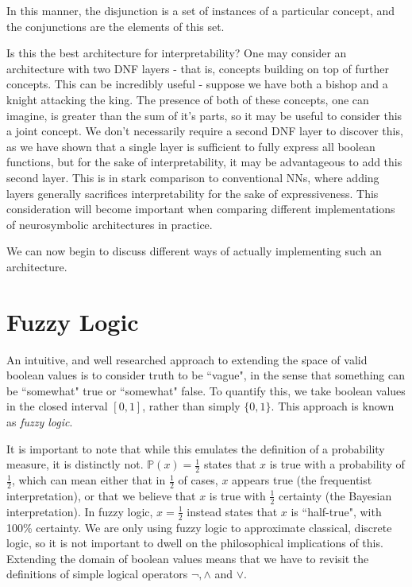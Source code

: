 \documentclass[conference]{report}
\begin{document}
In this manner, the disjunction is a set of instances of a particular concept, and the conjunctions are the elements of this set.

Is this the best architecture for interpretability? One may consider an architecture with two DNF layers - that is, concepts building on top of further concepts. This can be incredibly useful - suppose we have both a bishop and a knight attacking the king. The presence of both of these concepts, one can imagine, is greater than the sum of it's parts, so it may be useful to consider this a joint concept. We don't necessarily require a second DNF layer to discover this, as we have shown that a single layer is sufficient to fully express all boolean functions, but for the sake of interpretability, it may be advantageous to add this second layer. This is in stark comparison to conventional NNs, where adding layers generally sacrifices interpretability for the sake of expressiveness. This consideration will become important when comparing different implementations of neurosymbolic architectures in practice.

We can now begin to discuss different ways of actually implementing such an architecture.

\section{Fuzzy Logic}

An intuitive, and well researched approach to extending the space of valid boolean values is to consider truth to be ``vague", in the sense that something can be ``somewhat" true or ``somewhat" false. To quantify this, we take boolean values in the closed interval $[0,1]$, rather than simply $\{0,1\}$. This approach is known as \textit{fuzzy logic}.

It is important to note that while this emulates the definition of a probability measure, it is distinctly not. $\mathbb{P}(x) = \frac{1}{2}$ states that $x$ is true with a probability of $\frac{1}{2}$, which can mean either that in $\frac{1}{2}$ of cases, $x$ appears true (the frequentist interpretation), or that we believe that $x$ is true with $\frac{1}{2}$ certainty (the Bayesian interpretation). In fuzzy logic, $x = \frac{1}{2}$ instead states that $x$ is ``half-true", with 100\% certainty. We are only using fuzzy logic to approximate classical, discrete logic, so it is not important to dwell on the philosophical implications of this. Extending the domain of boolean values means that we have to revisit the definitions of simple logical operators $\lnot, \land$ and $\lor$.
\end{document}
